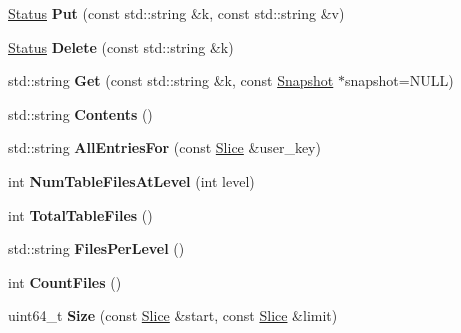 \begin{DoxyCompactItemize}
\mbox{\label{classleveldb_1_1_d_b_test_a5ec1a1d5ecc1744f325159eb81e46514}} 
\mbox{\hyperlink{classleveldb_1_1_status}{Status}} {\bfseries Put} (const std\+::string \&k, const std\+::string \&v)
\item 
\mbox{\label{classleveldb_1_1_d_b_test_a25716ec93d525adbeea8ff71e8f3a9f4}} 
\mbox{\hyperlink{classleveldb_1_1_status}{Status}} {\bfseries Delete} (const std\+::string \&k)
\item 
\mbox{\label{classleveldb_1_1_d_b_test_a6af558e1fca4a9f1bbf86d72d3d4aa6c}} 
std\+::string {\bfseries Get} (const std\+::string \&k, const \mbox{\hyperlink{classleveldb_1_1_snapshot}{Snapshot}} $\ast$snapshot=N\+U\+LL)
\item 
\mbox{\label{classleveldb_1_1_d_b_test_a3cf871664bd22c6ed2d6c2a8834b49fc}} 
std\+::string {\bfseries Contents} ()
\item 
\mbox{\label{classleveldb_1_1_d_b_test_adaf171601eaaf2cd24edaa394752f733}} 
std\+::string {\bfseries All\+Entries\+For} (const \mbox{\hyperlink{classleveldb_1_1_slice}{Slice}} \&user\+\_\+key)
\item 
\mbox{\label{classleveldb_1_1_d_b_test_aa7c845810f6d57b0655eda370e8de33f}} 
int {\bfseries Num\+Table\+Files\+At\+Level} (int level)
\item 
\mbox{\label{classleveldb_1_1_d_b_test_a05fa745351a41ecc0165b391a605b79e}} 
int {\bfseries Total\+Table\+Files} ()
\item 
\mbox{\label{classleveldb_1_1_d_b_test_a0e4d6292bcbe450d34b558d48a51a331}} 
std\+::string {\bfseries Files\+Per\+Level} ()
\item 
\mbox{\label{classleveldb_1_1_d_b_test_a0c6c0c1d470a50fdcb6cdbc54977e907}} 
int {\bfseries Count\+Files} ()
\item 
\mbox{\label{classleveldb_1_1_d_b_test_a2b16106ccbd302127b5c0575e74e6be1}} 
uint64\+\_\+t {\bfseries Size} (const \mbox{\hyperlink{classleveldb_1_1_slice}{Slice}} \&start, const \mbox{\hyperlink{classleveldb_1_1_slice}{Slice}} \&limit)

\end{DoxyCompactItemize}
